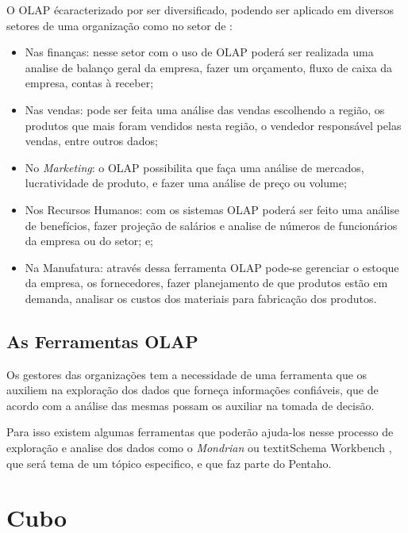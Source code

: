 O OLAP \'{e}caracterizado por ser diversificado, podendo ser aplicado em diversos setores de uma organiza\c{c}\~{a}o como no setor de \cite{olap-microsoft-2020}:

\begin{itemize}

    \item Nas finan\c{c}as: nesse setor com o uso de OLAP poder\'{a} ser realizada uma analise de balan\c{c}o geral da empresa, fazer um or\c{c}amento, fluxo de caixa da empresa, contas \`{a} receber;
    \item Nas vendas: pode ser feita uma an\'{a}lise das vendas escolhendo a regi\~{a}o, os produtos que mais foram vendidos nesta regi\~{a}o, o vendedor respons\'{a}vel pelas vendas, entre outros dados;
    \item No \textit{Marketing}: o OLAP possibilita que fa\c{c}a uma an\'{a}lise de mercados, lucratividade de produto, e fazer uma an\'{a}lise de pre\c{c}o ou volume;
    \item Nos Recursos Humanos: com os sistemas OLAP poder\'{a} ser feito uma an\'{a}lise de benef\'{i}cios, fazer proje\c{c}\~{a}o de sal\'{a}rios e analise de números de funcion\'{a}rios da empresa ou do setor; e;
    \item Na Manufatura: atrav\'{e}s dessa ferramenta OLAP pode-se gerenciar o estoque da empresa, os fornecedores, fazer planejamento de que produtos est\~{a}o em demanda, analisar os custos dos materiais para fabrica\c{c}\~{a}o dos produtos.

\end{itemize}

\subsection{As Ferramentas OLAP}

Os gestores das organiza\c{c}\~{o}es tem a necessidade de uma ferramenta que os auxiliem na explora\c{c}\~{a}o dos dados que forne\c{c}a informa\c{c}\~{o}es confi\'{a}veis, que de acordo com a an\'{a}lise das mesmas possam os auxiliar na tomada de decis\~{a}o. 

Para isso existem algumas ferramentas que poder\~{a}o ajuda-los nesse processo de explora\c{c}\~{a}o e analise dos dados como o \textit{Mondrian} ou textit{Schema Workbench} , que ser\'{a} tema de um t\'{o}pico especifico, e que faz parte do Pentaho.

\section{Cubo}

